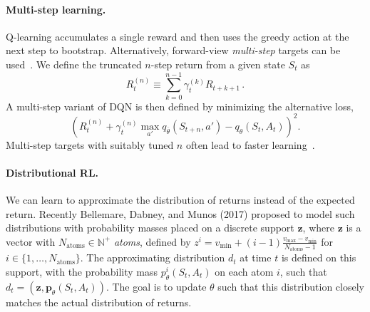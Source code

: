 \documentclass[letterpaper]{article} %
\def\z{\bm z}
\def\p{\bm p}
\begin{document}
\paragraph{Multi-step learning.}
Q-learning accumulates a single reward and then uses the greedy action at the next step to bootstrap. Alternatively, forward-view \textit{multi-step} targets can be used~\cite{Sutton:1988}.  We define the truncated $n$-step return from a given state $S_t$ as
\begin{equation}\label{multiR}
R_t^{(n)} \equiv \sum_{k=0}^{n-1} {\gamma_t^{(k)} R_{t+k+1}} \,.
\end{equation}
A multi-step variant of DQN is then defined by minimizing the alternative loss, 
%
\[  %
(R_t^{(n)} +\gamma_t^{(n)}  \max_{a'} q_{\overline{\theta}}(S_{t+n},a') - q_\theta(S_t, A_t))^2.
\]  %
%
\noindent Multi-step targets with suitably tuned $n$ often lead to faster learning~\cite{Sutton:1998book}.


\paragraph{Distributional RL.}
We can learn to approximate the distribution of returns instead of the expected return.  Recently Bellemare, Dabney, and Munos (2017)\nocite{Bellemare2017ADP} proposed to model such distributions with probability masses placed on a discrete support ${\bm z}$, where $\z$ is a vector with $N_{\text{atoms}} \in \mathbb{N}^+$ \emph{atoms}, defined by $z^i = v_{\min} + (i-1)\frac{v_{\max}-v_{\min}}{N_{\text{atoms}}-1}$ for $i \in \{1, \ldots, N_{\text{atoms}}\}$.  The approximating distribution $d_t$ at time $t$ is defined on this support, with the probability mass $p^i_{\theta}(S_t, A_t)$ on each atom $i$, such that $d_t = (\z, \p_{\theta}(S_t, A_t))$.  The goal is to update $\theta$ such that this distribution closely matches the actual distribution of returns.
\end{document}
